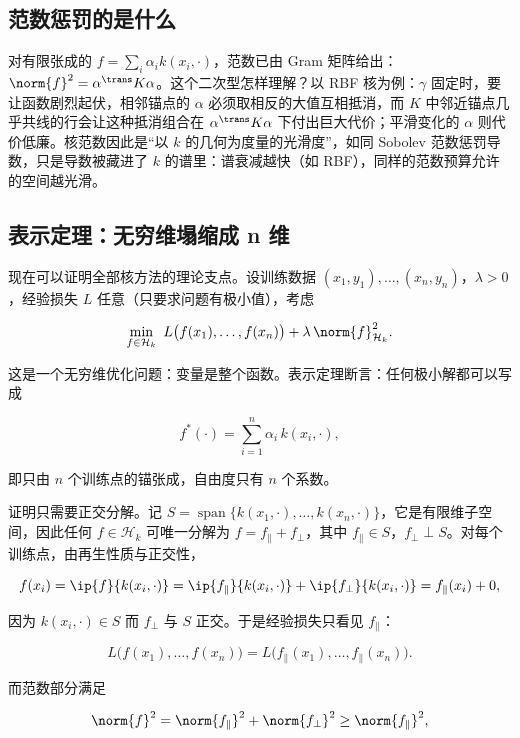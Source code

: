 \subsection{范数惩罚的是什么}

对有限张成的 \(f=\sum_i\alpha_i k(x_i,\cdot)\)，范数已由 Gram 矩阵给出：\(\norm{f}^{2}=\alpha^{\trans}K\alpha\)。这个二次型怎样理解？以 RBF 核为例：\(\gamma\) 固定时，要让函数剧烈起伏，相邻锚点的 \(\alpha\) 必须取相反的大值互相抵消，而 \(K\) 中邻近锚点几乎共线的行会让这种抵消组合在 \(\alpha^{\trans}K\alpha\) 下付出巨大代价；平滑变化的 \(\alpha\) 则代价低廉。核范数因此是``以 \(k\) 的几何为度量的光滑度''，如同 Sobolev 范数惩罚导数，只是导数被藏进了 \(k\) 的谱里：谱衰减越快（如 RBF），同样的范数预算允许的空间越光滑。

\subsection{表示定理：无穷维塌缩成 n 维}

现在可以证明全部核方法的理论支点。设训练数据 \((x_1,y_1),\dots,(x_n,y_n)\)，\(\lambda>0\)，经验损失 \(L\) 任意（只要求问题有极小值），考虑

\[
\min_{f\in\mathcal{H}_k}\ 
L\bigl(f(x_1),\dots,f(x_n)\bigr)
+\lambda\,\norm{f}_{\mathcal{H}_k}^{2}.
\]

这是一个无穷维优化问题：变量是整个函数。表示定理断言：任何极小解都可以写成

\[
f^{*}(\cdot)=\sum_{i=1}^{n}\alpha_i\,k(x_i,\cdot),
\]

即只由 \(n\) 个训练点的锚张成，自由度只有 \(n\) 个系数。

证明只需要正交分解。记 \(S=\operatorname{span}\{k(x_1,\cdot),\dots,k(x_n,\cdot)\}\)，它是有限维子空间，因此任何 \(f\in\mathcal{H}_k\) 可唯一分解为 \(f=f_{\parallel}+f_{\perp}\)，其中 \(f_{\parallel}\in S\)，\(f_{\perp}\perp S\)。对每个训练点，由再生性质与正交性，

\[
f(x_i)
=\ip{f}{k(x_i,\cdot)}
=\ip{f_{\parallel}}{k(x_i,\cdot)}+\ip{f_{\perp}}{k(x_i,\cdot)}
=f_{\parallel}(x_i)+0,
\]

因为 \(k(x_i,\cdot)\in S\) 而 \(f_{\perp}\) 与 \(S\) 正交。于是经验损失只看见 \(f_{\parallel}\)：

\[
L\bigl(f(x_1),\dots,f(x_n)\bigr)
=L\bigl(f_{\parallel}(x_1),\dots,f_{\parallel}(x_n)\bigr).
\]

而范数部分满足

\[
\norm{f}^{2}
=\norm{f_{\parallel}}^{2}+\norm{f_{\perp}}^{2}
\ge\norm{f_{\parallel}}^{2},
\]

